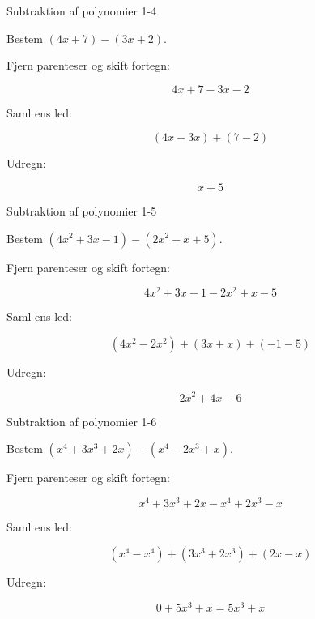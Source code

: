 \documentclass{article}
\begin{document}
\newpage

\begin{exercise}{Subtraktion af polynomier 1-4}

Bestem $(4x + 7) - (3x + 2)$.


\hint

Fjern parenteser og skift fortegn:

\hint
\[
4x + 7 - 3x - 2
\]

\hint

Saml ens led:

\hint
\[
(4x - 3x) + (7 - 2)
\]

\hint

Udregn:

\hint
\[
x + 5
\]

\end{exercise}

\newpage

\begin{exercise}{Subtraktion af polynomier 1-5}

Bestem $(4x^2 + 3x - 1) - (2x^2 - x + 5)$.


\hint

Fjern parenteser og skift fortegn:

\hint
\[
4x^2 + 3x - 1 - 2x^2 + x - 5
\]

\hint

Saml ens led:

\hint
\[
(4x^2 - 2x^2) + (3x + x) + (-1 - 5)
\]

\hint

Udregn:

\hint
\[
2x^2 + 4x - 6
\]

\end{exercise}

\newpage

\begin{exercise}{Subtraktion af polynomier 1-6}

Bestem $(x^4 + 3x^3 + 2x) - (x^4 - 2x^3 + x)$.


\hint

Fjern parenteser og skift fortegn:

\hint
\[
x^4 + 3x^3 + 2x - x^4 + 2x^3 - x
\]

\hint

Saml ens led:

\hint
\[
(x^4 - x^4) + (3x^3 + 2x^3) + (2x - x)
\]

\hint

Udregn:

\hint
\[
0 + 5x^3 + x = 5x^3 + x
\]

\end{exercise}
\end{document}
